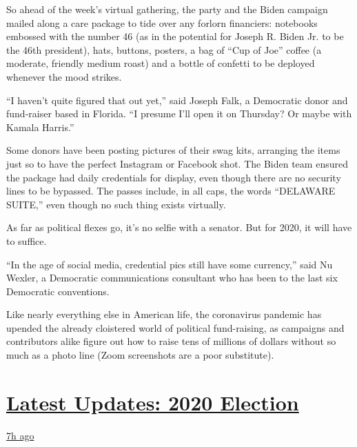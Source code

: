 So ahead of the week's virtual gathering, the party and the Biden
campaign mailed along a care package to tide over any forlorn
financiers: notebooks embossed with the number 46 (as in the potential
for Joseph R. Biden Jr. to be the 46th president), hats, buttons,
posters, a bag of ``Cup of Joe'' coffee (a moderate, friendly medium
roast) and a bottle of confetti to be deployed whenever the mood
strikes.

``I haven't quite figured that out yet,'' said Joseph Falk, a Democratic
donor and fund-raiser based in Florida. ``I presume I'll open it on
Thursday? Or maybe with Kamala Harris.''

Some donors have been posting pictures of their swag kits, arranging the
items just so to have the perfect Instagram or Facebook shot. The Biden
team ensured the package had daily credentials for display, even though
there are no security lines to be bypassed. The passes include, in all
caps, the words ``DELAWARE SUITE,'' even though no such thing exists
virtually.

As far as political flexes go, it's no selfie with a senator. But for
2020, it will have to suffice.

``In the age of social media, credential pics still have some
currency,'' said Nu Wexler, a Democratic communications consultant who
has been to the last six Democratic conventions.

Like nearly everything else in American life, the coronavirus pandemic
has upended the already cloistered world of political fund-raising, as
campaigns and contributors alike figure out how to raise tens of
millions of dollars without so much as a photo line (Zoom screenshots
are a poor substitute).

\hypertarget{latest-updates-2020-election}{%
\section{\texorpdfstring{\href{https://www.nytimes3xbfgragh.onion/live/2020/08/19/us/dnc-convention-election?action=click\&pgtype=Article\&state=default\&region=MAIN_CONTENT_1\&context=storylines_live_updates}{Latest
Updates: 2020
Election}}{Latest Updates: 2020 Election}}\label{latest-updates-2020-election}}

\href{https://www.nytimes3xbfgragh.onion/live/2020/08/19/us/dnc-convention-election?action=click\&pgtype=Article\&state=default\&region=MAIN_CONTENT_1\&context=storylines_live_updates\#night-3-featured-more-policy-a-focus-on-women-and-a-full-throated-rejection-of-trump-by-his-predecessor}{7h
ago}

